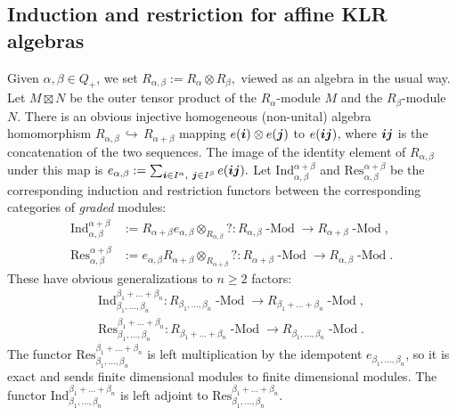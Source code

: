\documentclass[twoside,11pt,reqno]{amsart}
\numberwithin{equation}{section}
\theoremstyle{definition}  %
\def\bi{\text{\boldmath$i$}}
\def\bj{\text{\boldmath$j$}}
\newcommand{\0}{{\bar 0}}
\newcommand{\1}{{\bar 1}}
\newcommand{\Ind}{{\mathrm {Ind}}}
\newcommand{\Res}{{\mathrm {Res}}}
\def\into{{\hookrightarrow}}
\def\Mod#1{#1\!\operatorname{-Mod}}
\begin{document}
\subsection{Induction and restriction for affine KLR algebras}
Given $\alpha, \beta \in Q_+$, we set $
R_{\alpha,\beta} := R_\alpha \otimes 
R_\beta,$ 
viewed as an algebra in the usual way. 
Let $M \boxtimes N$ be 
the outer tensor product of the $R_\alpha$-module $M$ and the $R_\beta$-module 
$N$.
There is an obvious injective homogeneous (non-unital) algebra homomorphism 
$R_{\alpha,\beta}\,\into\, R_{\alpha+\beta}$ 
mapping $e(\bi) \otimes e(\bj)$ to $e(\bi\bj)$,
where $\bi\bj$ is the concatenation of the two sequences. The image of the identity
element of $R_{\alpha,\beta}$ under this map is
$%
e_{\alpha,\beta}:= \sum_{\bi \in I^\alpha,\ \bj \in I^\beta} e(\bi\bj).
$ %
Let $\Ind_{\alpha,\beta}^{\alpha+\beta}$ and $\Res_{\alpha,\beta}^{\alpha+\beta}$
be the corresponding induction and restriction functors between the corresponding categories of {\em graded}
modules: 
\begin{align*}
\Ind_{\alpha,\beta}^{\alpha+\beta} &:= R_{\alpha+\beta} e_{\alpha,\beta}
\otimes_{R_{\alpha,\beta}} ?:\Mod{R_{\alpha,\beta}} \rightarrow \Mod{R_{\alpha+\beta}},\\
\Res_{\alpha,\beta}^{\alpha+\beta} &:= e_{\alpha,\beta} R_{\alpha+\beta}
\otimes_{R_{\alpha+\beta}} ?:\Mod{R_{\alpha+\beta}}\rightarrow \Mod{R_{\alpha,\beta}}.
\end{align*}
These have obvious generalizations to $n\geq 2$ factors: 
\begin{align*}
\Ind_{\beta_1,\dots,\beta_n}^{\beta_1+\dots+\beta_n} :\Mod{R_{\beta_1,\dots,\beta_n}} \rightarrow \Mod{R_{\beta_1+\dots+\beta_n}},\\
\Res_{\beta_1,\dots,\beta_n}^{\beta_1+\dots+\beta_n} :\Mod{R_{\beta_1+\dots+\beta_n}}\rightarrow \Mod{R_{\beta_1,\dots,\beta_n}}.
\end{align*}
The functor $\Res_{\beta_1,\dots,\beta_n}^{\beta_1+\dots+\beta_n}$ is left multiplication by
the idempotent $e_{\beta_1,\dots,\beta_n}$, so it is exact and sends finite dimensional modules to
finite dimensional modules. 
The functor $\Ind_{\beta_1,\dots,\beta_n}^{\beta_1+\dots+\beta_n}$ is left adjoint to $\Res_{\beta_1,\dots,\beta_n}^{\beta_1+\dots+\beta_n}$. 
\end{document}
